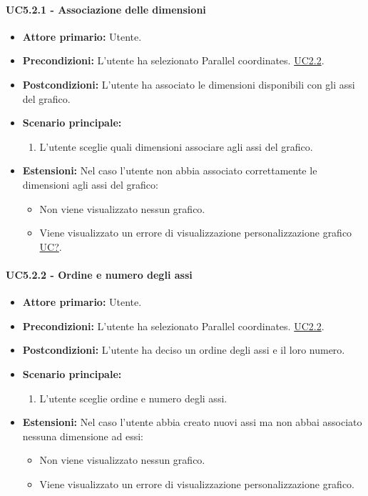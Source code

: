 \paragraph{UC5.2.1 - Associazione delle dimensioni}
\label{sec:UC5.2.1}
    \begin{itemize}
        \item \textbf{Attore primario:} Utente.
        \item \textbf{Precondizioni:} L'utente ha selezionato Parallel coordinates. \hyperref[sec:UC2.2]{UC2.2}.
	    \item \textbf{Postcondizioni:} L'utente ha associato le dimensioni disponibili con gli assi del grafico.
	    \item \textbf{Scenario principale:}
	    \begin{enumerate}
	    		\item L'utente sceglie quali dimensioni associare agli assi del grafico.
		\end{enumerate}
	    \item \textbf{Estensioni:} Nel caso l'utente non abbia associato correttamente le dimensioni agli assi del grafico:
              \begin{itemize}
                  \item Non viene visualizzato nessun grafico.
                  \item Viene visualizzato un errore di visualizzazione personalizzazione grafico \hyperref[sec:UC - Errore di personalizzazione]{UC?}.
              \end{itemize}
    \end{itemize}
\paragraph{UC5.2.2 - Ordine e numero degli assi}
\label{sec:UC5.2.2}
    \begin{itemize}
        \item \textbf{Attore primario:} Utente.
        \item \textbf{Precondizioni:} L'utente ha selezionato Parallel coordinates. \hyperref[sec:UC2.2]{UC2.2}.
	    \item \textbf{Postcondizioni:} L'utente ha deciso un ordine degli assi e il loro numero.
	    \item \textbf{Scenario principale:} 
	    \begin{enumerate}
	    		\item L'utente sceglie ordine e numero degli assi.
		\end{enumerate}
	    \item \textbf{Estensioni:} Nel caso l'utente abbia creato nuovi assi ma non abbai associato nessuna dimensione ad essi:
              \begin{itemize}
                  \item Non viene visualizzato nessun grafico.
                  \item Viene visualizzato un errore di visualizzazione personalizzazione grafico.
              \end{itemize}
    \end{itemize}

